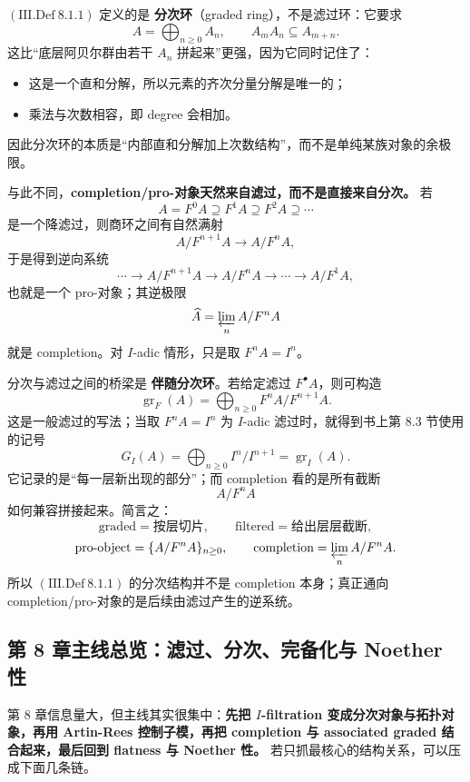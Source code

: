 \documentclass[a4paper]{ctexart}
\theoremstyle{definition}
\theoremstyle{analysis}
\theoremstyle{plain}
\begin{document}
\((\mathrm{III.Def}\ 8.1.1)\) 定义的是 \textbf{分次环}（graded ring），不是滤过环：它要求
\[
  A=\bigoplus_{n\ge 0}A_n,
  \qquad
  A_mA_n\subseteq A_{m+n}.
\]
这比“底层阿贝尔群由若干 \(A_n\) 拼起来”更强，因为它同时记住了：
\begin{itemize}
  \item 这是一个直和分解，所以元素的齐次分量分解是唯一的；
  \item 乘法与次数相容，即 degree 会相加。
\end{itemize}
因此分次环的本质是“内部直和分解加上次数结构”，而不是单纯某族对象的余极限。

\medskip

与此不同，\textbf{completion/pro-对象天然来自滤过，而不是直接来自分次。} 若
\[
  A=F^0A\supseteq F^1A\supseteq F^2A\supseteq \cdots
\]
是一个降滤过，则商环之间有自然满射
\[
  A/F^{n+1}A\longrightarrow A/F^nA,
\]
于是得到逆向系统
\[
  \cdots\longrightarrow A/F^{n+1}A\longrightarrow A/F^nA\longrightarrow \cdots \longrightarrow A/F^1A,
\]
也就是一个 pro-对象；其逆极限
\[
  \widehat A=\varprojlim_n A/F^nA
\]
就是 completion。对 \(I\)-adic 情形，只是取 \(F^nA=I^n\)。

\medskip

分次与滤过之间的桥梁是 \textbf{伴随分次环}。若给定滤过 \(F^\bullet A\)，则可构造
\[
  \operatorname{gr}_F(A)
  =
  \bigoplus_{n\ge 0}F^nA/F^{n+1}A.
\]
这是一般滤过的写法；当取 \(F^nA=I^n\) 为 \(I\)-adic 滤过时，就得到书上第 8.3 节使用的记号
\[
  G_I(A)
  =
  \bigoplus_{n\ge 0}I^n/I^{n+1}
  =
  \operatorname{gr}_I(A).
\]
它记录的是“每一层新出现的部分”；而 completion 看的是所有截断
\[
  A/F^nA
\]
如何兼容拼接起来。简言之：
\[
  \text{graded}
  =
  \text{按层切片},
  \qquad
  \text{filtered}
  =
  \text{给出层层截断},
\]
\[
  \text{pro-object}
  =
  \{A/F^nA\}_{n\ge 0},
  \qquad
  \text{completion}
  =
  \varprojlim_n A/F^nA.
\]
所以 \((\mathrm{III.Def}\ 8.1.1)\) 的分次结构并不是 completion 本身；真正通向 completion/pro-对象的是后续由滤过产生的逆系统。

\subsection{\texorpdfstring{第 8 章主线总览：滤过、分次、完备化与 Noether 性}{第 8 章主线总览}}\label{subsec:topic-ch8-roadmap}

\label{rem:ch8-roadmap}
第 8 章信息量大，但主线其实很集中：\textbf{先把 \(I\)-filtration 变成分次对象与拓扑对象，再用 Artin-Rees 控制子模，再把 completion 与 associated graded 结合起来，最后回到 flatness 与 Noether 性。} 若只抓最核心的结构关系，可以压成下面几条链。
\end{document}
